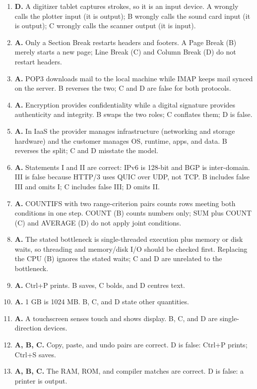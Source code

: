 \documentclass[11pt]{article}
\begin{document}
\begin{enumerate}[label=\textbf{Q\arabic*.}, leftmargin=*]
  to secondary storage. B swaps the top two levels; C and D scramble the
  order.
\item \textbf{D.} A digitizer tablet captures strokes, so it is an input
  device. A wrongly calls the plotter input (it is output); B wrongly calls
  the sound card input (it is output); C wrongly calls the scanner output (it
  is input).
\item \textbf{A.} Only a Section Break restarts headers and footers. A Page
  Break (B) merely starts a new page; Line Break (C) and Column Break (D) do
  not restart headers.
\item \textbf{A.} POP3 downloads mail to the local machine while IMAP keeps
  mail synced on the server. B reverses the two; C and D are false for both
  protocols.
\item \textbf{A.} Encryption provides confidentiality while a digital
  signature provides authenticity and integrity. B swaps the two roles; C
  conflates them; D is false.
\item \textbf{A.} In IaaS the provider manages infrastructure (networking and
  storage hardware) and the customer manages OS, runtime, apps, and data. B
  reverses the split; C and D misstate the model.
\item \textbf{A.} Statements I and II are correct: IPv6 is 128-bit and BGP is
  inter-domain. III is false because HTTP/3 uses QUIC over UDP, not TCP. B
  includes false III and omits I; C includes false III; D omits II.
\item \textbf{A.} COUNTIFS with two range-criterion pairs counts rows meeting
  both conditions in one step. COUNT (B) counts numbers only; SUM plus COUNT
  (C) and AVERAGE (D) do not apply joint conditions.
\item \textbf{A.} The stated bottleneck is single-threaded execution plus
  memory or disk waits, so threading and memory/disk I/O should be checked
  first. Replacing the CPU (B) ignores the stated waits; C and D are
  unrelated to the bottleneck.

\item \textbf{A.} Ctrl+P prints. B saves, C bolds, and D centres text.
\item \textbf{A.} 1 GB is 1024 MB. B, C, and D state other quantities.
\item \textbf{A.} A touchscreen senses touch and shows display. B, C, and D are single-direction devices.
\item \textbf{A, B, C.} Copy, paste, and undo pairs are correct. D is false: Ctrl+P prints; Ctrl+S saves.
\item \textbf{A, B, C.} The RAM, ROM, and compiler matches are correct. D is false: a printer is output.
\end{enumerate}
\def\JKSSBLessonID{48}\def\JKSSBAnswers{1}
\end{document}
